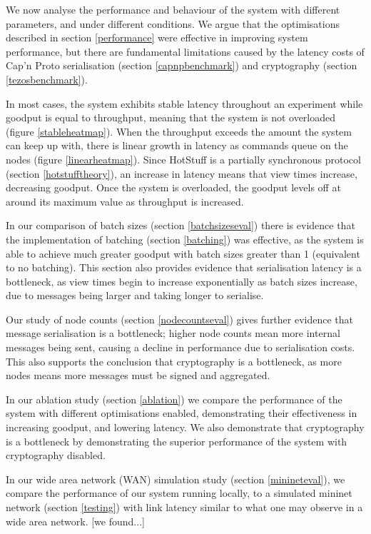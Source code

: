 We now analyse the performance and behaviour of the system with different parameters, and under different conditions. We argue that the optimisations described in section \ref{performance} were effective in improving system performance, but there are fundamental limitations caused by the latency costs of Cap'n Proto serialisation (section \ref{capnpbenchmark}) and cryptography (section \ref{tezosbenchmark}).

In most cases, the system exhibits stable latency throughout an experiment while goodput is equal to throughput, meaning that the system is not overloaded (figure \ref{stableheatmap}). When the throughput exceeds the amount the system can keep up with, there is linear growth in latency as commands queue on the nodes (figure \ref{linearheatmap}). Since HotStuff is a partially synchronous protocol (section \ref{hotstufftheory}), an increase in latency means that view times increase, decreasing goodput. Once the system is overloaded, the goodput levels off at around its maximum value as throughput is increased.

In our comparison of batch sizes (section \ref{batchsizeseval}) there is evidence that the implementation of batching (section \ref{batching}) was effective, as the system is able to achieve much greater goodput with batch sizes greater than 1 (equivalent to no batching). This section also provides evidence that serialisation latency is a bottleneck, as view times begin to increase exponentially as batch sizes increase, due to messages being larger and taking longer to serialise.

Our study of node counts (section \ref{nodecountseval}) gives further evidence that message serialisation is a bottleneck; higher node counts mean more internal messages being sent, causing a decline in performance due to serialisation costs. This also supports the conclusion that cryptography is a bottleneck, as more nodes means more messages must be signed and aggregated.

In our ablation study (section \ref{ablation}) we compare the performance of the system with different optimisations enabled, demonstrating their effectiveness in increasing goodput, and lowering latency. We also demonstrate that cryptography is a bottleneck by demonstrating the superior performance of the system with cryptography disabled.

In our wide area network (WAN) simulation study (section \ref{minineteval}), we compare the performance of our system running locally, to a simulated mininet network (section \ref{testing}) with link latency similar to what one may observe in a wide area network. [we found...]

